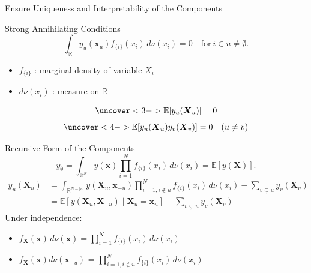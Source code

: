 \begin{frame}{Ensure Uniqueness and Interpretability of the Components} %
  \begin{block}{Strong Annihilating Conditions}
    \[
      \int_{\mathbb{R}} y_u(\boldsymbol{x}_u) f_{\{i\}}(x_i) \, d\nu(x_i) = 0 
      \quad \text{for} \ i \in u \neq \emptyset.
    \]
  \end{block}

  \begin{itemize}
    \item<2-> $f_{\{i\}}$ : marginal density of variable $X_i$
    \item<2-> $d\nu(x_i)$ : measure on $\mathbb{R}$
  \end{itemize}

  \[
    \uncover<3->{\mathbb{E}[y_u(\boldsymbol{X}_u)] = 0}
  \]
  \[
    \uncover<4->{\mathbb{E}[y_u(\boldsymbol{X}_u) y_v(\boldsymbol{X}_v)] = 0 \quad (u \neq v)}
  \]
\end{frame}


\begin{frame}{Recursive Form of the Components} %
    \[
    y_{\emptyset} = \int_{\mathbb{R}^N} y(\boldsymbol{x}) \prod_{i=1}^{N} f_{\{i\}}(x_i) \, d\nu (x_i) = \mathbb{E}[y(\boldsymbol{X})].
    \]
\begin{align*}
    y_u(\boldsymbol{X}_u) 
    &= \int_{\mathbb{R}^{N- |u|}} 
        y(\boldsymbol{X}_u, \boldsymbol{x}_{-u}) 
        \prod_{i=1, i \notin u}^{N} f_{\{i\}}(x_i) 
        \, d\nu (x_i) 
      - \sum_{v \subsetneq u} y_v(\boldsymbol{X}_v) \\
    &= \mathbb{E}[y(\boldsymbol{X}_{u}, \boldsymbol{X}_{-u}) \mid \boldsymbol{X}_u = \boldsymbol{x}_u] - \sum_{v \subsetneq u} y_v(\boldsymbol{X}_v)
    \label{eq:fanova_components_classical}
\end{align*}
Under independence:
  \begin{itemize}
    \item \(f_{\boldsymbol{X}}(\boldsymbol{x}) \, d\nu(\boldsymbol{x}) = \prod_{i=1}^{N} f_{\{i\}}(x_i) \, d\nu(x_i)\)
    \item $f_{\boldsymbol{X}}(\boldsymbol{x})d \nu (\boldsymbol{x}_{-u})$ = $\prod_{i=1, i \notin u}^{N} f_{\{i\}}(x_i) \, d\nu (x_i)$
  \end{itemize}
\end{frame}

